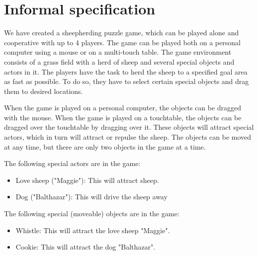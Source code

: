 \documentclass[a4paper,10pt]{report}
\begin{document}
\section{Informal specification}
We have created a sheepherding puzzle game, which can be played alone and cooperative with up to 4 players.
The game can be played both on a personal computer using a mouse or on a multi-touch table.
The game environment consists of a grass field with a herd of sheep and several special objects and actors in it.
The players have the task to herd the sheep to a specified goal area as fast as possible.
To do so, they have to select certain special objects and drag them to desired locations.

When the game is played on a personal computer, the objects can be dragged with the mouse. 
When the game is played on a touchtable, the objects can be dragged over the touchtable by dragging over it.
These objects will attract special actors, which in turn will attract or repulse the sheep.
The objects can be moved at any time, but there are only two objects in the game at a time.

The following special actors are in the game: \\

\begin{itemize}

\item
	Love sheep ("Maggie"): This will attract sheep.
\item
	Dog ("Balthazar"): This will drive the sheep away \\
\end{itemize}
The following special (moveable) objects are in the game:\\
\begin{itemize}
\item
	Whistle: This will attract the love sheep "Maggie".
\item
Cookie: This will attract the dog "Balthazar".\\
\end{itemize}
\end{document}
